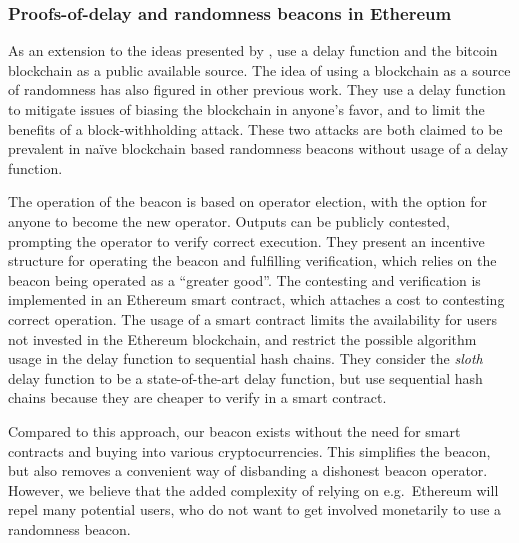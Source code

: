 \subsubsection{Proofs-of-delay and randomness beacons in Ethereum}%
\label{ssub:proofs_of_delay}
As an extension to the ideas presented by \citet{randomzoo}, \citet{bunz2017proofsof} use a delay function and the bitcoin blockchain as a public available source.
The idea of using a blockchain as a source of randomness has also figured in other previous work.
They use a delay function to mitigate issues of biasing the blockchain in anyone's favor, and to limit the benefits of a block-withholding attack.
These two attacks are both claimed to be prevalent in naïve blockchain based randomness beacons without usage of a delay function.

The operation of the beacon is based on operator election, with the option for anyone to become the new operator.
Outputs can be publicly contested, prompting the operator to verify correct execution.
They present an incentive structure for operating the beacon and fulfilling verification, which relies on the beacon being operated as a \enquote{greater good}.
The contesting and verification is implemented in an Ethereum smart contract, which attaches a cost to contesting correct operation.
The usage of a smart contract limits the availability for users not invested in the Ethereum blockchain, and restrict the possible algorithm usage in the delay function to sequential hash chains.
They consider the \textit{sloth} delay function to be a state-of-the-art delay function, but use sequential hash chains because they are cheaper to verify in a smart contract.

Compared to this approach, our beacon exists without the need for smart contracts and buying into various cryptocurrencies.
This simplifies the beacon, but also removes a convenient way of disbanding a dishonest beacon operator.
However, we believe that the added complexity of relying on e.g.\ Ethereum will repel many potential users, who do not want to get involved monetarily to use a randomness beacon.

